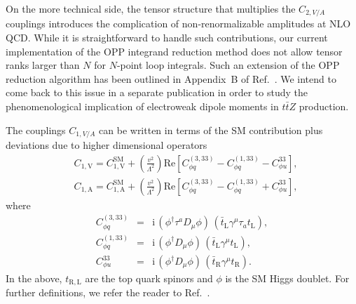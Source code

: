 \documentclass{JHEP3}
\def\ttbZ{t\bar{t}Z}
\def\ConeA{C_{1,\mathrm{A}}}
\def\ConeV{C_{1,\mathrm{V}}}
\newcommand{\be}{\begin{eqnarray}}
\newcommand{\ee}{\end{eqnarray}}
\begin{document}
On the more technical side, the tensor structure that multiplies the $C_{2,V/A}$ couplings introduces the complication of 
non-renormalizable amplitudes at NLO QCD.
While it is straightforward to handle such contributions, our current implementation of the OPP integrand reduction method 
does not allow tensor ranks larger than $N$ for $N$-point loop integrals.
Such an extension of the OPP reduction algorithm has been outlined in Appendix~B of Ref.~\cite{Mastrolia:2012bu}. 
We intend to come back to this issue in a separate publication in order to study the phenomenological implication of electroweak dipole moments in $\ttbZ$ production.

The couplings $C_{1,V/A}$ can be written in terms of the SM contribution plus deviations due to higher dimensional operators
\be
   \label{Cone_NP}
   &\ConeV=\ConeV^\mathrm{SM}+\left(\frac{v^2}{\Lambda^2} \right) \mathrm{Re} \left[ C^{(3,33)}_{\phi q} - C^{(1,33)}_{\phi q} - C^{33}_{\phi u}   \right],
   \\
   &\ConeA=\ConeA^\mathrm{SM}+\left(\frac{v^2}{\Lambda^2} \right) \mathrm{Re}\left[  C^{(3,33)}_{\phi q} - C^{(1,33)}_{\phi q} + C^{33}_{\phi u}  \right],
   \nonumber
\ee
where 
\be  
  \label{EFTOp}
  C^{(3,33)}_{\phi q} &=& \mathrm{i} \, (\phi^\dagger \tau^a D_\mu \phi) \, (\bar{t}_\mathrm{L} \gamma^\mu \tau_a t_\mathrm{L})  ,
  \nonumber \\
  C^{(1,33)}_{\phi q} &=& \mathrm{i} \, (\phi^\dagger D_\mu \phi) \, (\bar{t}_\mathrm{L} \gamma^\mu t_\mathrm{L})  ,
 \\
  C^{33}_{\phi u} &=& \mathrm{i} \, (\phi^\dagger D_\mu \phi) \, (\bar{t}_\mathrm{R} \gamma^\mu t_\mathrm{R}).
  \nonumber
\ee
In the above, $t_\mathrm{R,L}$ are the top quark spinors and $\phi$ is the SM Higgs doublet. 
For further definitions, we refer the reader to Ref.~\cite{AguilarSaavedra:2008zc}.
\\
\end{document}
